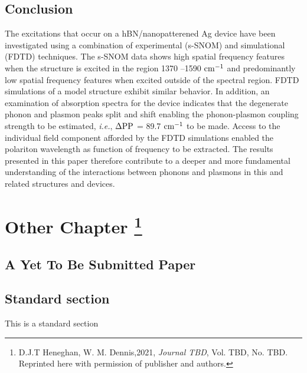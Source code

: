 \documentclass[
reprint,
amsmath,amssymb,
aip,
jap,
floatfix,
]{revtex4-2}
\begin{document}
  \section{Conclusion}
  \label{sec:conclusion}
    The excitations that occur on a hBN/nanopatterened Ag device have been investigated using a combination of experimental (s-SNOM) and simulational (FDTD) techniques. The s-SNOM data shows high spatial frequency features when the structure is excited in the region 1370 –1590 $\rm cm^{-1}$  and predominantly low spatial frequency features when excited outside of the spectral region. FDTD simulations of a model structure exhibit similar behavior. In addition, an examination of absorption spectra for the device indicates that the degenerate phonon and plasmon peaks split and shift enabling the phonon-plasmon coupling strength to be estimated, \textit{i.e.}, $\Delta{\rm{PP}}$ = 89.7 $\rm cm^{-1}$  to be made. Access to the individual field component afforded by the FDTD simulations enabled the polariton wavelength as function of frequency to be extracted. The results presented in this paper therefore contribute to a deeper and more fundamental understanding of the interactions between phonons and plasmons in this and related structures and devices.
  




\chapter[Other Paper]
{Other Chapter%
  \footnote{D.J.T Heneghan, W. M. Dennis,2021, 
  \emph{Journal TBD}, Vol. TBD, No. TBD. \indent\indent Reprinted here with permission of publisher and authors.}}
\label{chapter:MHD}
\newpage

\section{A Yet To Be Submitted Paper}
\label{sec:intro3}



 \section{Standard section}
 
 This is a standard section
\end{document}
